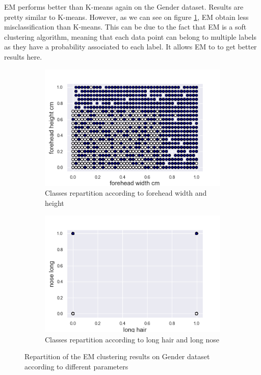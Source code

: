 \documentclass[twocolumn, 10pt]{article}
\begin{document}
			EM performs better than K-means again on the Gender dataset. Results are pretty similar to K-means. However, as we can see on figure \ref{fig:g_EM_sep}, EM obtain less misclassification than K-means. This can be due to the fact that EM is a soft clustering algorithm, meaning that each data point can belong to multiple labels as they have a probability associated to each label. It allows EM to to get better results here.

			\begin{figure}[h]
				\centering
				\begin{subfigure}[t]{.49\columnwidth}
					\centering
					\includegraphics[width=\linewidth]{../graphics/EM_forehead_width_cm_forehead_height_cm_label.png}
					\caption{Classes repartition according to forehead width and height}
					\label{fig:g_EM_sep}
				\end{subfigure}
				\begin{subfigure}[t]{.49\columnwidth}
					\centering
					\includegraphics[width=\linewidth]{../graphics/EM_long_hair_nose_long_label.png}
					\caption{Classes repartition according to long hair and long nose}
					\label{fig:g_EM_pet}
				\end{subfigure}
				\caption{Repartition of the EM clustering results on Gender dataset according to different parameters}
				\label{fig:g_EM}
			\end{figure}
\end{document}
